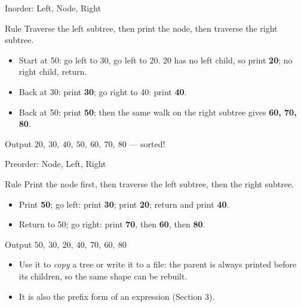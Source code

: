 \documentclass[aspectratio=169]{beamer}
\begin{document}
\begin{frame}{Inorder: Left, Node, Right}
  \begin{block}{Rule}
    Traverse the left subtree, then print the node, then traverse the right
    subtree.
  \end{block}
  \begin{itemize}
    \item Start at 50: go left to 30, go left to 20. 20 has no left child,
      so print \textbf{20}; no right child, return.
    \item Back at 30: print \textbf{30}; go right to 40: print \textbf{40}.
    \item Back at 50: print \textbf{50}; then the same walk on the right
      subtree gives \textbf{60, 70, 80}.
  \end{itemize}
  \begin{exampleblock}{Output}
    $20,\ 30,\ 40,\ 50,\ 60,\ 70,\ 80$ --- sorted!
  \end{exampleblock}
\end{frame}

\begin{frame}{Preorder: Node, Left, Right}
  \begin{block}{Rule}
    Print the node first, then traverse the left subtree, then the right
    subtree.
  \end{block}
  \begin{itemize}
    \item Print \textbf{50}; go left: print \textbf{30}; print \textbf{20};
      return and print \textbf{40}.
    \item Return to 50; go right: print \textbf{70}, then \textbf{60}, then
      \textbf{80}.
  \end{itemize}
  \begin{exampleblock}{Output}
    $50,\ 30,\ 20,\ 40,\ 70,\ 60,\ 80$
  \end{exampleblock}
  \begin{itemize}
    \item Use it to \emph{copy} a tree or write it to a file: the parent is
      always printed before its children, so the same shape can be rebuilt.
    \item It is also the prefix form of an expression (Section 3).
  \end{itemize}
\end{frame}
\end{document}
